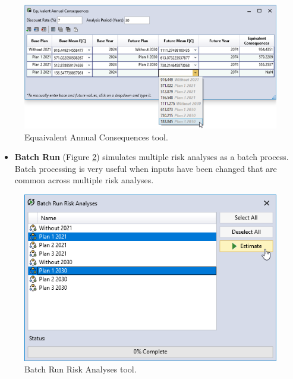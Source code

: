 \documentclass[
]{book}
\providecommand{\tightlist}{%
  \setlength{\itemsep}{0pt}\setlength{\parskip}{0pt}}
\begin{document}
\begin{figure}

{\centering \includegraphics{images/figure11} 

}

\caption{Equaivalent Annual Consequences tool.}\label{fig:figure-11}
\end{figure}

\begin{itemize}
\tightlist
\item
  \textbf{Batch Run} (Figure \ref{fig:figure-12}) simulates multiple risk analyses as a batch process. Batch processing is very useful when inputs have been changed that are common across multiple risk analyses.
\end{itemize}

\begin{figure}

{\centering \includegraphics{images/figure12} 

}

\caption{Batch Run Risk Analyses tool.}\label{fig:figure-12}
\end{figure}
\end{document}
